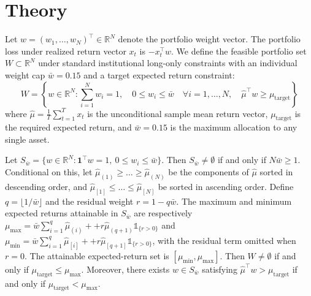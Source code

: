 \documentclass[smallextended]{svjour3}
\begin{document}
\section{Theory}\label{sec:theory}
Let $w = (w_1, \dots, w_N)^\top \in \mathbb{R}^N$ denote the portfolio weight vector. The portfolio loss under realized return vector $x_t$ is $-x_t^\top w$. We define the feasible portfolio set $W \subset \mathbb{R}^N$ under standard institutional long-only constraints with an individual weight cap $\bar{w} = 0.15$ and a target expected return constraint:
\begin{equation}
    W = \left\{ w \in \mathbb{R}^N : \sum_{i=1}^N w_i = 1, \quad 0 \le w_i \le \bar{w} \quad \forall i=1,\dots,N, \quad \hat{\mu}^\top w \ge \mu_{\text{target}} \right\}
\end{equation}
where $\hat{\mu} = \frac{1}{T} \sum_{t=1}^T x_t$ is the unconditional sample mean return vector, $\mu_{\text{target}}$ is the required expected return, and $\bar{w} = 0.15$ is the maximum allocation to any single asset.

\begin{proposition}
Let $S_{\bar w}=\{w \in \mathbb{R}^N : \mathbf{1}^\top w=1,\ 0\leq w_i\leq\bar w\}$. Then $S_{\bar w}\neq\emptyset$ if and only if $N\bar w\geq 1$. Conditional on this, let $\hat{\mu}_{(1)} \ge \dots \ge \hat{\mu}_{(N)}$ be the components of $\hat{\mu}$ sorted in descending order, and $\hat{\mu}_{[1]} \le \dots \le \hat{\mu}_{[N]}$ be sorted in ascending order. Define $q = \lfloor 1/\bar{w} \rfloor$ and the residual weight $r = 1 - q \bar{w}$. The maximum and minimum expected returns attainable in $S_{\bar w}$ are respectively $\mu_{\max} = \bar{w} \sum_{i=1}^q \hat{\mu}_{(i)} + + r \hat{\mu}_{(q+1)} \mathbb{1}_{\{r>0\}}$ and $\mu_{\min} = \bar{w} \sum_{i=1}^q \hat{\mu}_{[i]} + + r \hat{\mu}_{[q+1]} \mathbb{1}_{\{r>0\}}$, with the residual term omitted when $r=0$. The attainable expected-return set is $[\mu_{\min}, \mu_{\max}]$. Then $W\neq\emptyset$ if and only if $\mu_{\mathrm{target}}\leq\mu_{\max}$. Moreover, there exists $w\in S_{\bar w}$ satisfying $\hat\mu^\top w>\mu_{\mathrm{target}}$ if and only if $\mu_{\mathrm{target}}<\mu_{\max}$.
\end{proposition}
\end{document}
